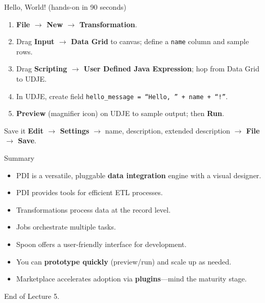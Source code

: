 \documentclass[aspectratio=169]{beamer}
\begin{document}
\begin{frame}{Hello, World! (hands-on in 90 seconds)}
    \begin{enumerate}
        \item \textbf{File \(\rightarrow\) New \(\rightarrow\) Transformation}.
        \item Drag \textbf{Input \(\rightarrow\) Data Grid} to canvas; define a \texttt{name} column and sample rows.
        \item Drag \textbf{Scripting \(\rightarrow\) User Defined Java Expression}; hop from Data Grid to UDJE.
        \item In UDJE, create field
        \texttt{hello\_message = ``Hello, '' + name + ``!''}.
        \item \textbf{Preview} (magnifier icon) on UDJE to sample output; then \textbf{Run}.
    \end{enumerate}
    \begin{block}{Save it}
        \textbf{Edit \(\rightarrow\) Settings} \(\rightarrow\) name, description, extended description \(\rightarrow\) \textbf{File \(\rightarrow\) Save}.
    \end{block}
\end{frame}

\begin{frame}{Summary}
    \begin{itemize}
        \item PDI is a versatile, pluggable \textbf{data integration} engine with a visual designer.
        \item PDI provides tools for efficient ETL processes.
        \item Transformations process data at the record level.
        \item Jobs orchestrate multiple tasks.
        \item Spoon offers a user-friendly interface for development.
        \item You can \textbf{prototype quickly} (preview/run) and scale up as needed.
        \item Marketplace accelerates adoption via \textbf{plugins}—mind the maturity stage.
    \end{itemize}
\end{frame}


\begin{frame}{}
    \centering
    \Huge End of Lecture 5.
\end{frame}
\end{document}
